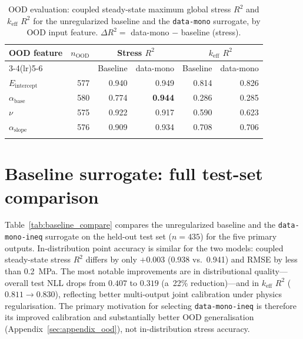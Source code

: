 \documentclass[pdflatex,sn-mathphys-num]{sn-jnl}
\theoremstyle{thmstyleone}
\theoremstyle{thmstyletwo}
\theoremstyle{thmstylethree}
\begin{document}
\begin{appendices}
\begin{table}[ht]
\caption{%
  OOD evaluation: coupled steady-state maximum global stress $R^2$ and $k_{\mathrm{eff}}$
  $R^2$ for the unregularized baseline and the \texttt{data-mono} surrogate, by OOD input
  feature.
  $\Delta R^2 = $ data-mono $-$ baseline (stress).
}\label{tab:ood_full}
\begin{tabular}{@{}lrrrrr@{}}
\toprule
OOD feature & $n_{\mathrm{OOD}}$ &
  \multicolumn{2}{c}{Stress $R^2$} &
  \multicolumn{2}{c}{$k_{\mathrm{eff}}$ $R^2$} \\
\cmidrule(lr){3-4}\cmidrule(lr){5-6}
& & Baseline & data-mono & Baseline & data-mono \\
\midrule
$E_{\mathrm{intercept}}$ & 577 & 0.940 & 0.949 & 0.814 & 0.826 \\
$\alpha_{\mathrm{base}}$ & 580 & 0.774 & \textbf{0.944} & 0.286 & 0.285 \\
$\nu$                    & 575 & 0.922 & 0.917 & 0.590 & 0.623 \\
$\alpha_{\mathrm{slope}}$& 576 & 0.909 & 0.934 & 0.708 & 0.706 \\
\botrule
\end{tabular}
\end{table}

\section{Baseline surrogate: full test-set comparison}\label{sec:appendix_baseline}

Table~\ref{tab:baseline_compare} compares the unregularized baseline and the
\texttt{data-mono-ineq} surrogate on the held-out test set ($n = 435$) for the five
primary outputs.
In-distribution point accuracy is similar for the two models: coupled steady-state
stress $R^2$ differs by only $+0.003$ (0.938 vs.\ 0.941) and RMSE by
less than \SI{0.2}{MPa}.
The most notable improvements are in distributional quality---overall test NLL drops
from $0.407$ to $0.319$ (a~22\% reduction)---and in $k_{\mathrm{eff}}$
$R^2$ ($0.811 \to 0.830$), reflecting better multi-output joint calibration under
physics regularisation.
The primary motivation for selecting \texttt{data-mono-ineq} is therefore its
improved calibration and substantially better OOD generalisation
(Appendix~\ref{sec:appendix_ood}), not in-distribution stress accuracy.


\end{appendices}
\end{document}
